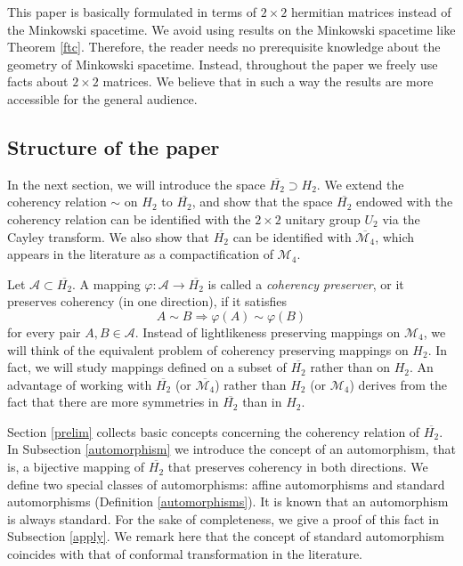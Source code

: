 \documentclass[10pt]{amsart}
\theoremstyle{definition}
\theoremstyle{remark}
\numberwithin{subsection}{section}
\numberwithin{equation}{section}
\newcommand\oH{{\overline{H_2}}}
\begin{document}
This paper is basically formulated in terms of $2\times 2$ hermitian matrices instead of the Minkowski spacetime.
We avoid using results on the Minkowski spacetime like Theorem \ref{ftc}.
Therefore, the reader needs no prerequisite knowledge about the geometry of Minkowski spacetime. 
Instead, throughout the paper we freely use facts about $2\times 2$ matrices. We believe that in such a way the results are more accessible for the general audience.




\subsection{Structure of the paper} 
In the next section, we will introduce the space $\overline{H_2}\supset H_2$. 
We extend the coherency relation $\sim$ on $H_2$ to $\oH$, and show that the space $\overline{H_2}$ endowed with the coherency relation can be identified with the $2\times 2$ unitary group $U_2$ via the Cayley transform. 
We also show that $\oH$ can be identified with $\overline{\mathcal{M}_4}$, which appears in the literature as a compactification of $\mathcal{M}_4$.  

Let $\mathcal{A}\subset \oH$. 
A mapping $\varphi\colon \mathcal{A}\to \oH$ is called a \emph{coherency preserver}, or it preserves coherency (in one direction), if it satisfies 
\[
A\sim B\Rightarrow \varphi(A) \sim \varphi(B)
\]
for every pair $A, B\in \mathcal{A}$.
Instead of lightlikeness preserving mappings on $\mathcal{M}_4$, we will think of the equivalent problem of coherency preserving mappings on $H_2$.
In fact, we will study mappings defined on a subset of $\oH$ rather than on $H_2$.
An advantage of working with $\oH$ (or $\overline{\mathcal{M}_4}$) rather than $H_2$ (or $\mathcal{M}_4$) derives from the fact that there are more symmetries in $\oH$ than in $H_2$. 

Section \ref{prelim} collects basic concepts concerning the coherency relation of $\oH$. 
In Subsection \ref{automorphism} we introduce the concept of an automorphism, that is, a bijective mapping of $\oH$ that preserves coherency in both directions. 
We define two special classes of automorphisms: affine automorphisms and standard automorphisms (Definition \ref{automorphisms}). 
It is known that an automorphism is always standard. For the sake of completeness, we give a proof of this fact in Subsection \ref{apply}.
We remark here that the concept of standard automorphism coincides with that of conformal transformation in the literature. 
\end{document}

